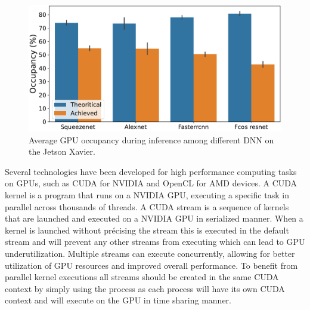 

\begin{figure}[t!]
	\centering
	\includegraphics[width=\linewidth]{chapters/roomie/images/theoritical_achieved_occupancy_batch_size64.pdf}
	\caption{Average GPU occupancy during inference among different DNN on the Jetson Xavier.}
	\label{fig:theoritical_achieved_occupancy}
\end{figure}

Several technologies have been developed for high performance computing tasks on GPUs, such as CUDA for NVIDIA and OpenCL for AMD devices. A CUDA kernel is a program that runs on a NVIDIA GPU, executing a specific task in parallel across thousands of threads. A CUDA stream is a sequence of kernels that are launched and executed on a NVIDIA GPU in serialized manner. When a kernel is launched without précising the stream this is executed in the default stream and will prevent any other streams from executing which can lead to GPU underutilization. Multiple streams can execute concurrently, allowing for better utilization of GPU resources and improved overall performance. To benefit from parallel kernel executions all streams should be created in the same CUDA context by simply using the process as each process will have its own CUDA context and will execute on the GPU in time sharing manner.

